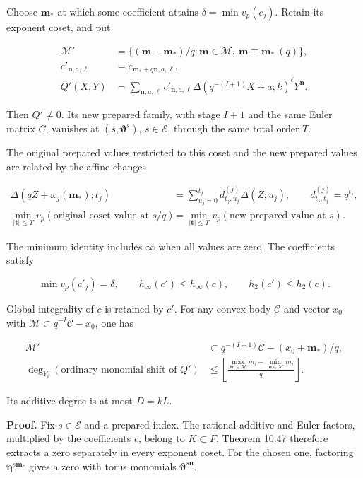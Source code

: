 \documentclass[
  11pt,
  a4paper,
]{article}
\begin{document}
Choose \(\boldsymbol m_*\) at which some coefficient attains
\(\delta=\min v_p(c_j)\). Retain its exponent coset, and put

\[
\begin{aligned}
\mathcal M'&=\{(\boldsymbol m-\boldsymbol m_*)/q:
\boldsymbol m\in\mathcal M,\ \boldsymbol m\equiv\boldsymbol m_*\ (q)\},\\
c'_{\boldsymbol n,a,\ell}&=c_{\boldsymbol m_*+q\boldsymbol n,a,\ell},\\
Q'(X,Y)&=\sum_{\boldsymbol n,a,\ell}c'_{\boldsymbol n,a,\ell}
\Delta(q^{-(I+1)}X+a;k)^\ell Y^{\boldsymbol n}.
\end{aligned}
\tag{10.132}
\]

Then \(Q'\ne0\). Its new prepared family, with stage \(I+1\) and the
same Euler matrix \(C\), vanishes at \((s,\boldsymbol\vartheta^s)\),
\(s\in\mathcal E\), through the same total order \(T\).

The original prepared values restricted to this coset and the new
prepared values are related by the affine changes

\[
\begin{aligned}
\Delta(qZ+\omega_j(\boldsymbol m_*);t_j)
&=\sum_{u_j=0}^{t_j}d_{t_j,u_j}^{(j)}\Delta(Z;u_j),
\qquad d_{t_j,t_j}^{(j)}=q^{t_j},\\
\min_{|\boldsymbol t|\le T}v_p(\text{original coset value at }s/q)
&=\min_{|\boldsymbol t|\le T}v_p(\text{new prepared value at }s).
\end{aligned}
\tag{10.133}
\]

The minimum identity includes \(\infty\) when all values are zero. The
coefficients satisfy

\[
\min v_p(c'_j)=\delta,\qquad
h_\infty(c')\le h_\infty(c),\qquad h_2(c')\le h_2(c).
\tag{10.134}
\]

Global integrality of \(c\) is retained by \(c'\). For any convex body
\(\mathcal C\) and vector \(x_0\) with
\(\mathcal M\subset q^{-I}\mathcal C-x_0\), one has

\[
\begin{aligned}
\mathcal M'&\subset q^{-(I+1)}\mathcal C-(x_0+\boldsymbol m_*)/q,\\
\deg_{Y_i}(\text{ordinary monomial shift of }Q')
&\le\left\lfloor
\frac{\max_{\boldsymbol m\in\mathcal M}m_i-
\min_{\boldsymbol m\in\mathcal M}m_i}{q}\right\rfloor.
\end{aligned}
\tag{10.135}
\]

Its additive degree is at most \(D=kL\).

\textbf{Proof.} Fix \(s\in\mathcal E\) and a prepared index. The
rational additive and Euler factors, multiplied by the coefficients
\(c\), belong to \(K\subset F\). Theorem 10.47 therefore extracts a zero
separately in every exponent coset. For the chosen one, factoring
\(\boldsymbol\eta^{s\boldsymbol m_*}\) gives a zero with torus monomials
\(\boldsymbol\vartheta^{s\boldsymbol n}\).
\end{document}
